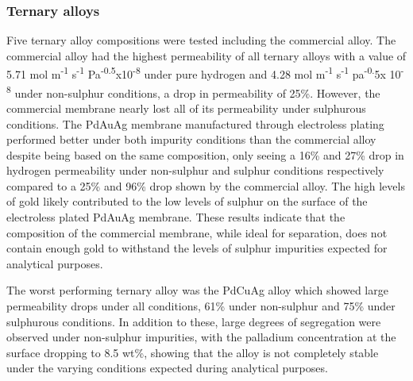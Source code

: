 \subsubsection{Ternary alloys}
Five ternary alloy compositions were tested including the commercial alloy. The commercial alloy had the highest permeability of all ternary alloys with a value of 5.71 mol m\textsuperscript{-1} s\textsuperscript{-1} Pa\textsuperscript{-0.5}x10\textsuperscript{-8} under pure hydrogen and 4.28 mol m\textsuperscript{-1} s\textsuperscript{-1} pa\textsuperscript{-0.}5x 10\textsuperscript{-8}  under non-sulphur conditions, a drop in permeability of 25\%. However, the commercial membrane nearly lost all of its permeability under sulphurous conditions. The PdAuAg membrane manufactured through electroless plating performed better under both impurity conditions than the commercial alloy despite being based on the same composition, only seeing a 16\% and 27\% drop in hydrogen permeability under non-sulphur and sulphur conditions respectively compared to a 25\% and 96\% drop shown by the commercial alloy. The high levels of gold likely contributed to the low levels of sulphur on the surface of the electroless plated PdAuAg membrane. These results indicate that the composition of the commercial membrane, while ideal for separation, does not contain enough gold to withstand the levels of sulphur impurities expected for analytical purposes. 

The worst performing ternary alloy was the PdCuAg alloy which showed large permeability drops under all conditions, 61\% under non-sulphur and 75\% under sulphurous conditions. In addition to these, large degrees of segregation were observed under non-sulphur impurities, with the palladium concentration at the surface dropping to 8.5 wt\%, showing that the alloy is not completely stable under the varying conditions expected during analytical purposes.  

